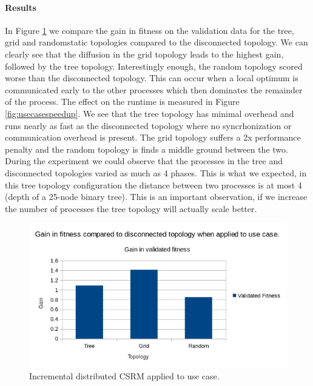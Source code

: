\paragraph{Results}
In Figure \ref{fig:usecasedistributed} we compare the gain in fitness on the validation data for the tree, grid and randomstatic topologies compared to the disconnected topology. We can clearly see that the diffusion in the grid topology leads to the highest gain, followed by the tree topology. Interestingly enough, the random topology scored worse than the disconnected topology. This can occur when a local optimum is communicated early to the other processes which then dominates the remainder of the process. The effect on the runtime is measured in Figure \ref{fig:usecasespeedup}. We see that the tree topology has minimal overhead and runs nearly as fast as the disconnected topology where no syncrhonization or communication overhead is present. The grid topology suffers a 2x performance penalty and the random topology is finds a middle ground between the two. During the experiment we could observe that the processes in the tree and disconnected topologies varied as much as 4 phases. This is what we expected, in this tree topology configuration the distance between two processes is at most 4 (depth of a 25-node binary tree). This is an important observation, if we increase the number of processes the tree topology will actually scale better.
\begin{figure}
    \centering
    \includegraphics[width=\textwidth,height=\textheight,keepaspectratio]{figures/usecasedistributed.png}
    \caption{Incremental distributed CSRM applied to use case.}
    \label{fig:usecasedistributed}
\end{figure}

